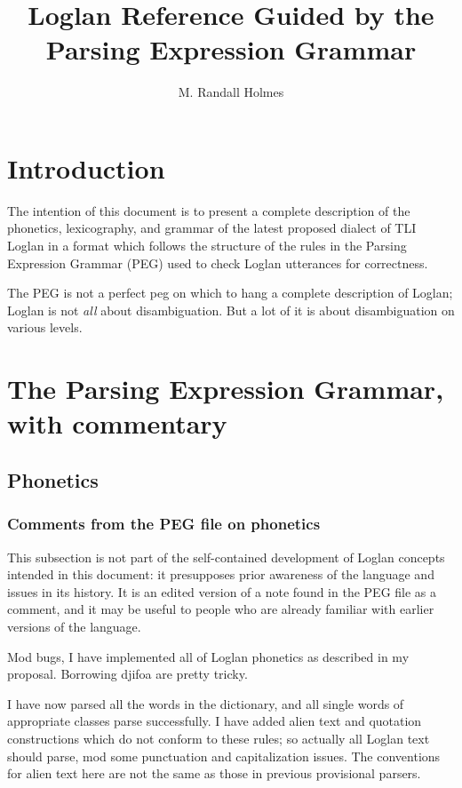 \documentclass{article}
\title{Loglan Reference Guided by the Parsing Expression Grammar}
\author{M. Randall Holmes}
\begin{document}
\maketitle

\section{Introduction}

The intention of this document is to present a complete description of the phonetics, lexicography, and grammar of the latest proposed dialect of TLI Loglan
in a format which follows the structure of the rules in the Parsing Expression Grammar (PEG) used to check Loglan utterances for correctness.

The PEG is not a perfect peg on which to hang a complete description of Loglan;  Loglan is not {\em all\/} about disambiguation.  But a lot of it is about disambiguation on various levels.

\tableofcontents

\section{The Parsing Expression Grammar, with commentary}

\subsection{Phonetics}

\subsubsection{Comments from the PEG file on phonetics}

This subsection is not part of the self-contained development of Loglan concepts intended in this document:  it presupposes prior awareness of the language and issues in its history.  It is an edited version of a note found in the PEG file as a comment, and it may be useful to people who are already familiar with earlier versions of the language.

 Mod bugs, I have implemented all of Loglan phonetics as described in my proposal.  Borrowing djifoa are pretty tricky.

 I have now parsed all the words in the dictionary, and all single words of appropriate classes parse successfully.
 I have added alien text and quotation constructions which do not conform to these rules; so actually
all Loglan text should parse,  mod some punctuation and capitalization issues.  The conventions for
alien text here are not the same as those in previous  provisional parsers.
\end{document}
